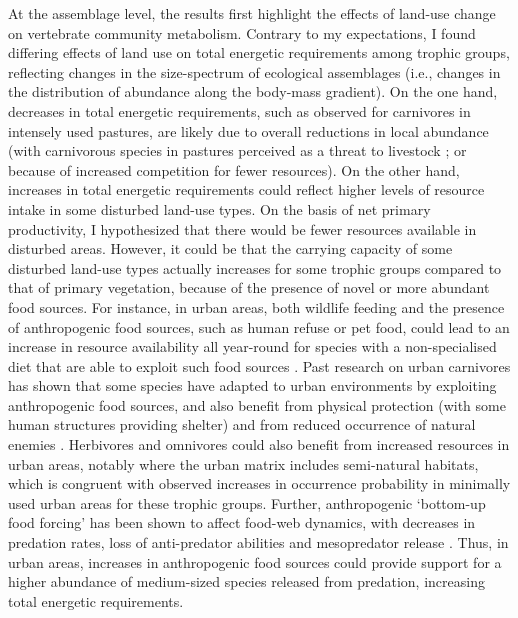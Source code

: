At the assemblage level, the results first highlight the effects of land-use change on vertebrate community metabolism. Contrary to my expectations, I found differing effects of land use on total energetic requirements among trophic groups, reflecting changes in the size-spectrum of ecological assemblages (i.e., changes in the distribution of abundance along the body-mass gradient). On the one hand, decreases in total energetic requirements, such as observed for carnivores in intensely used pastures, are likely due to overall reductions in local abundance (with carnivorous species in pastures perceived as a threat to livestock \citep{VanEeden2018}; or because of increased competition for fewer resources). On the other hand, increases in total energetic requirements could reflect higher levels of resource intake in some disturbed land-use types. On the basis of net primary productivity, I hypothesized that there would be fewer resources available in disturbed areas. However, it could be that the carrying capacity of some disturbed land-use types actually increases for some trophic groups compared to that of primary vegetation, because of the presence of novel or more abundant food sources. For instance, in urban areas, both wildlife feeding and the presence of anthropogenic food sources, such as human refuse or pet food, could lead to an increase in resource availability all year-round for species with a non-specialised diet that are able to exploit such food sources \citep{Fischer2012}.
Past research on urban carnivores has shown that some species have adapted to urban environments by exploiting anthropogenic food sources, and also benefit from physical protection (with some human structures providing shelter) and from reduced occurrence of natural enemies \citep{Bateman2012}. Herbivores and omnivores could also benefit from increased resources in urban areas, notably where the urban matrix includes semi-natural habitats, which is congruent with observed increases in occurrence probability in minimally used urban areas for these trophic groups. Further, anthropogenic `bottom-up food forcing' has been shown to affect food-web dynamics, with decreases in predation rates, loss of anti-predator abilities \citep{Geffroy2020} and mesopredator release \citep{Fischer2012}.  Thus, in urban areas, increases in anthropogenic food sources could provide support for a higher abundance of medium-sized species released from predation, increasing total energetic requirements.

